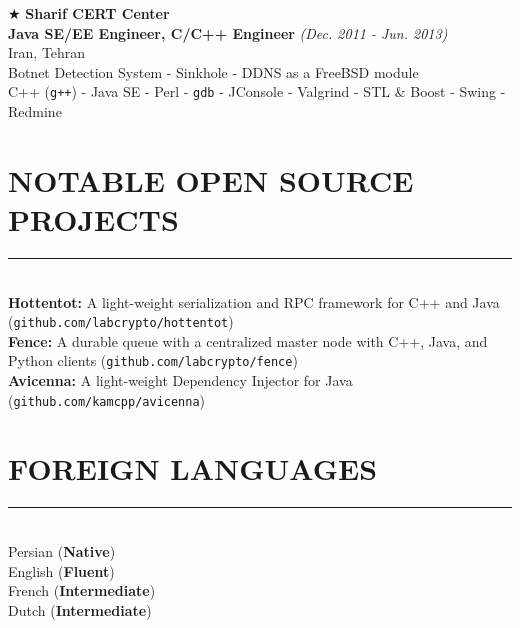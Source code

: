 \documentclass[10pt,a4paper]{article}
\begin{document}
\noindent $\bigstar$ \hspace{0.1cm} \large \textbf{Sharif CERT Center} \\ 
\indent \small \textbf{Java SE/EE Engineer, C/C++ Engineer} \textsl{(Dec. 2011 - Jun. 2013)} \\
\indent \textnormal{Iran, Tehran} \\ 
\indent \textbullet \hspace{0.05cm} Botnet Detection System - Sinkhole - DDNS as a FreeBSD module \\
\indent \textbullet \hspace{0.05cm} C++ (\texttt{g++}) - Java SE - Perl - \texttt{gdb} - JConsole - Valgrind - STL \& Boost - Swing - Redmine \\


\section{NOTABLE OPEN SOURCE PROJECTS}
\noindent \rule {18.0cm}{0.2pt} \\
    \textbullet \hspace{0.05cm} \textbf{Hottentot:} A light-weight serialization and RPC framework for C++ and Java (\texttt{github.com/labcrypto/hottentot}) \\
    \textbullet \hspace{0.05cm} \textbf{Fence:} A durable queue with a centralized master node with C++, Java, and Python clients (\texttt{github.com/labcrypto/fence}) \\
    \textbullet \hspace{0.05cm} \textbf{Avicenna:} A light-weight Dependency Injector for Java  (\texttt{github.com/kamcpp/avicenna}) \\
    
\section{FOREIGN LANGUAGES}
\noindent \rule {18.0cm}{0.2pt} \\
    \textbullet \hspace{0.05cm} Persian (\textbf{Native}) \\
    \textbullet \hspace{0.05cm} English (\textbf{Fluent}) \\
    \textbullet \hspace{0.05cm} French (\textbf{Intermediate}) \\
    \textbullet \hspace{0.05cm} Dutch (\textbf{Intermediate}) \\
\end{document}
